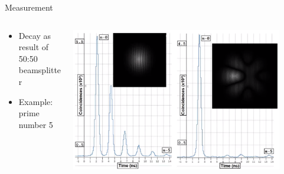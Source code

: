 \documentclass[aspectratio=169,9pt]{beamer}
\begin{document}
\begin{frame}[t]{Measurement}
  \begin{columns}[T]
    \begin{column}{0.4\textwidth}
      \begin{itemize}
        \item Decay as result of 50:50 beamsplitter
        \item Example: prime number 5
      \end{itemize}
      \vspace*{1em}
    \end{column}
    \begin{column}{0.6\textwidth}
      \includegraphics[width=0.9\textwidth]{example_measurement.png}
    \end{column}
  \end{columns}
\end{frame}
\end{document}
